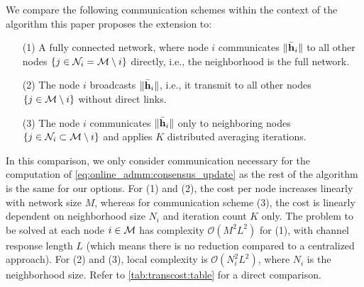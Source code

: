 \documentclass{article}
\begin{document}
We compare the following communication schemes within the context of the algorithm \cite{blochbergerDBSI} this paper proposes the extension to:
\begin{itemize}
    \itemsep-0.2em
    \item[(1)] A fully connected network, where node \(i\) communicates \(\|\bar{\bm{\mathrm{h}}}_i\|\) to all other nodes \(\{j \in \mathcal{N}_i = \mathcal{M} \setminus i\}\) directly, i.e., the neighborhood is the full network.
    \item[(2)] The node \(i\) broadcasts \(\|\bar{\bm{\mathrm{h}}}_i\|\), i.e., it transmit to all other nodes \(\{j \in \mathcal{M} \setminus i\}\) without direct links.
    \item[(3)] The node \(i\) communicates \(\|\bar{\bm{\mathrm{h}}}_i\|\) only to neighboring nodes \(\{j \in \mathcal{N}_i \subset \mathcal{M} \setminus i\}\) and applies \(K\) distributed averaging iterations.
\end{itemize}
In this comparison, we only consider communication necessary for the computation of \eqref{eq:online_admm:consensus_update} as the rest of the algorithm is the same for our options.
For (1) and (2), the cost per node increases linearly with network size \(M\), whereas for communication scheme (3), the cost is linearly dependent on neighborhood size \(N_i\) and iteration count \(K\) only.
The problem to be solved at each node \(i \in \mathcal{M}\) has complexity \(\mathcal{O}(M^2 L^2)\) for (1), with channel response length \(L\) (which means there is no reduction compared to a centralized approach).
For (2) and (3), local complexity is \(\mathcal{O}(N_i^2 L^2)\), where \(N_i\) is the neighborhood size.
Refer to \autoref{tab:transcost:table} for a direct comparison.
\end{document}

